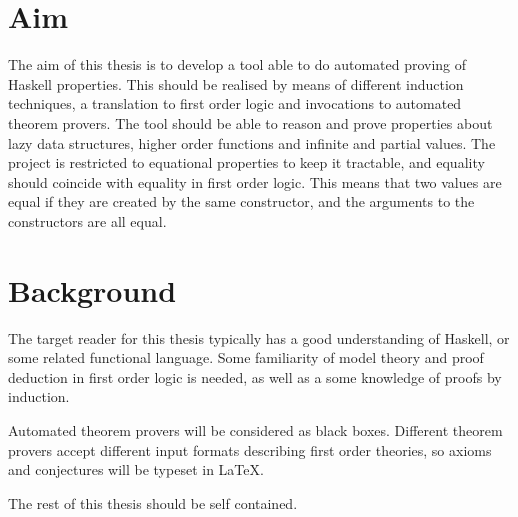 \section{Aim}

The aim of this thesis is to develop a tool able to do automated
proving of Haskell properties. This should be realised by means of
different induction techniques, a translation to first order logic and
invocations to automated theorem provers. The tool should be able to
reason and prove properties about lazy data structures, higher order
functions and infinite and partial values. The project is restricted
to equational properties to keep it tractable, and equality should
coincide with equality in first order logic. This means that two
values are equal if they are created by the same constructor, and the
arguments to the constructors are all equal.

\section{Background}

The target reader for this thesis typically has a good understanding
of Haskell, or some related functional language. Some familiarity
of model theory and proof deduction in first order logic is
needed, as well as a some knowledge of proofs by induction.

Automated theorem provers will be considered as black boxes. Different
theorem provers accept different input formats describing first order
theories, so axioms and conjectures will be typeset in \LaTeX.

The rest of this thesis should be self contained.












































